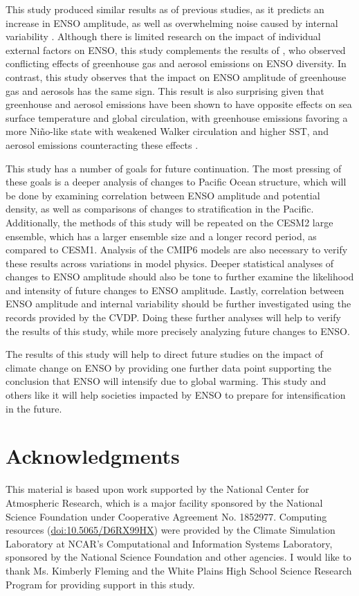 \documentclass[11pt]{article}
\begin{document}
This study produced similar results as of previous studies, as it predicts an increase in ENSO amplitude, as well as overwhelming noise caused by internal variability \citep{maher2018enso}. Although there is limited research on the impact of individual external factors on ENSO, this study complements the results of \citet{stevenson2017forced}, who observed conflicting effects of greenhouse gas and aerosol emissions on ENSO diversity. In contrast, this study observes that the impact on ENSO amplitude of greenhouse gas and aerosols has the same sign. This result is also surprising given that greenhouse and aerosol emissions have been shown to have opposite effects on sea surface temperature and global circulation, with greenhouse emissions favoring a more Niño-like state with weakened Walker circulation and higher SST, and aerosol emissions counteracting these effects \citep{boer2000transient}.

This study has a number of goals for future continuation. The most pressing of these goals is a deeper analysis of changes to Pacific Ocean structure, which will be done by examining correlation between ENSO amplitude and potential density, as well as comparisons of changes to stratification in the Pacific. Additionally, the methods of this study will be repeated on the CESM2 large ensemble, which has a larger ensemble size and a longer record period, as compared to CESM1. Analysis of the CMIP6 models are also necessary to verify these results across variations in model physics. Deeper statistical analyses of changes to ENSO amplitude should also be tone to further examine the likelihood and intensity of future changes to ENSO amplitude. Lastly, correlation between ENSO amplitude and internal variability should be further investigated using the records provided by the CVDP. Doing these further analyses will help to verify the results of this study, while more precisely analyzing future changes to ENSO.

The results of this study will help to direct future studies on the impact of climate change on ENSO by providing one further data point supporting the conclusion that ENSO will intensify due to global warming. This study and others like it will help societies impacted by ENSO to prepare for intensification in the future.

\section{Acknowledgments}
\label{sec:org42fbab9}

This material is based upon work supported by the National Center for Atmospheric Research, which is a major facility sponsored by the National Science Foundation under Cooperative Agreement No. 1852977. Computing resources (\href{https://doi.org/10.5065/D6RX99HX}{doi:10.5065/D6RX99HX}) were provided by the Climate Simulation Laboratory at NCAR's Computational and Information Systems Laboratory, sponsored by the National Science Foundation and other agencies. I would like to thank Ms. Kimberly Fleming and the White Plains High School Science Research Program for providing support in this study.




\end{document}
